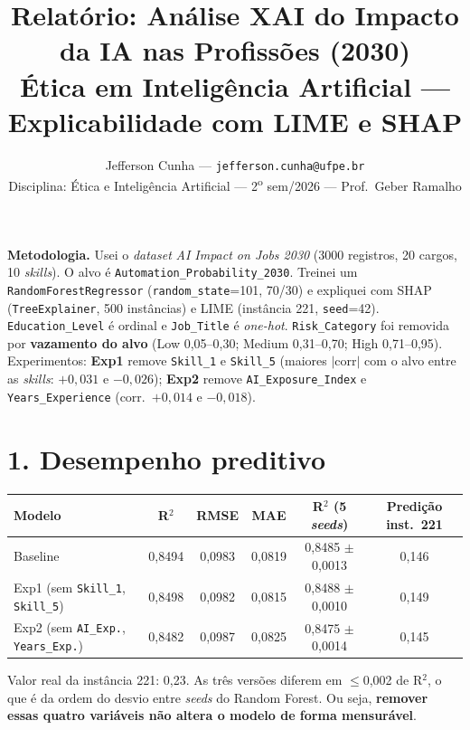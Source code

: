 \documentclass[10pt,a4paper]{article}
\title{\vspace{-1.4cm}\textbf{Relat\'orio: An\'alise XAI do Impacto da IA nas Profiss\~oes (2030)}\\[2pt]
\normalsize \'Etica em Intelig\^encia Artificial --- Explicabilidade com LIME e SHAP\vspace{-0.4cm}}
\author{\small Jefferson Cunha --- \texttt{jefferson.cunha@ufpe.br}\\[1pt]
\small Disciplina: \'Etica e Intelig\^encia Artificial --- 2\textsuperscript{o} sem/2026 --- Prof.\ Geber Ramalho}
\date{\vspace{-0.6cm}}
\begin{document}
\maketitle

\textbf{Metodologia.} Usei o \textit{dataset} \textit{AI Impact on Jobs 2030} (3000 registros, 20 cargos, 10 \textit{skills}). O alvo \'e \texttt{Automation\_}\allowbreak\texttt{Probability\_}\allowbreak\texttt{2030}. Treinei um \texttt{RandomForestRegressor} (\texttt{random\_state}=101, 70/30) e expliquei com SHAP (\texttt{TreeExplainer}, 500 inst\^ancias) e LIME (inst\^ancia 221, \texttt{seed}=42). \texttt{Education\_Level} \'e ordinal e \texttt{Job\_Title} \'e \textit{one-hot}. \texttt{Risk\_Category} foi removida por \textbf{vazamento do alvo} (Low 0,05--0,30; Medium 0,31--0,70; High 0,71--0,95). Experimentos: \textbf{Exp1} remove \texttt{Skill\_1} e \texttt{Skill\_5} (maiores $|$corr$|$ com o alvo entre as \textit{skills}: $+0{,}031$ e $-0{,}026$); \textbf{Exp2} remove \texttt{AI\_Exposure\_Index} e \texttt{Years\_Experience} (corr.\ $+0{,}014$ e $-0{,}018$).

\section*{1. Desempenho preditivo}
\begin{center}\small
\begin{tabular}{@{}lccccc@{}}
\toprule
Modelo & R$^2$ & RMSE & MAE & R$^2$ (5 \textit{seeds}) & Predi\c{c}\~ao inst.\ 221 \\ \midrule
Baseline & 0,8494 & 0,0983 & 0,0819 & 0,8485 $\pm$ 0,0013 & 0,146 \\
Exp1 (sem \texttt{Skill\_1}, \texttt{Skill\_5}) & 0,8498 & 0,0982 & 0,0815 & 0,8488 $\pm$ 0,0010 & 0,149 \\
Exp2 (sem \texttt{AI\_Exp.}, \texttt{Years\_Exp.}) & 0,8482 & 0,0987 & 0,0825 & 0,8475 $\pm$ 0,0014 & 0,145 \\ \bottomrule
\end{tabular}
\end{center}
Valor real da inst\^ancia 221: 0,23. As tr\^es vers\~oes diferem em $\le$0,002 de R$^2$, o que \'e da ordem do desvio entre \textit{seeds} do Random Forest. Ou seja, \textbf{remover essas quatro vari\'aveis n\~ao altera o modelo de forma mensur\'avel}.
\end{document}
